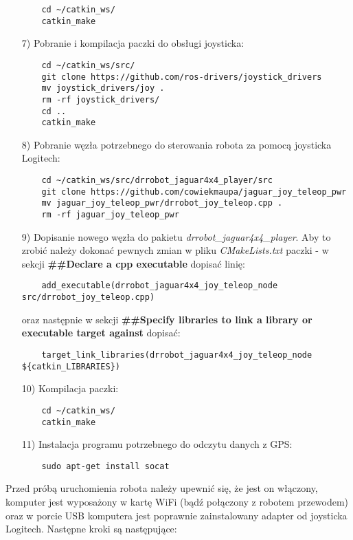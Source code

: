 \begin{enumerate}
	\begin{verbatim}
	cd ~/catkin_ws/
	catkin_make
	\end{verbatim}
\item[7)] Pobranie i kompilacja paczki do obsługi joysticka:
	\begin{verbatim}
	cd ~/catkin_ws/src/
	git clone https://github.com/ros-drivers/joystick_drivers
	mv joystick_drivers/joy .
	rm -rf joystick_drivers/
	cd ..
	catkin_make
	\end{verbatim}
\item[8)] Pobranie węzła potrzebnego do sterowania robota za pomocą joysticka Logitech:
	\begin{verbatim}
	cd ~/catkin_ws/src/drrobot_jaguar4x4_player/src
	git clone https://github.com/cowiekmaupa/jaguar_joy_teleop_pwr
	mv jaguar_joy_teleop_pwr/drrobot_joy_teleop.cpp .
	rm -rf jaguar_joy_teleop_pwr
	\end{verbatim}
\newpage
\item[9)] Dopisanie nowego węzła do pakietu \textit{drrobot\_jaguar4x4\_player}. Aby to zrobić należy dokonać pewnych zmian w pliku \textit{CMakeLists.txt} paczki  - w sekcji \textbf{\#\#Declare a cpp executable} dopisać linię:
	\begin{verbatim}
	add_executable(drrobot_jaguar4x4_joy_teleop_node src/drrobot_joy_teleop.cpp)
	\end{verbatim}
	oraz następnie w sekcji \textbf{\#\#Specify libraries to link a library or executable target against} dopisać:
	\begin{verbatim}
	target_link_libraries(drrobot_jaguar4x4_joy_teleop_node ${catkin_LIBRARIES})
	\end{verbatim}
\item[10)] Kompilacja paczki:
	\begin{verbatim}
	cd ~/catkin_ws/
	catkin_make
	\end{verbatim}
\item[11)] Instalacja programu potrzebnego do odczytu danych z GPS:
	\begin{verbatim}
	sudo apt-get install socat
	\end{verbatim}
\end{enumerate}
Przed próbą uruchomienia robota należy upewnić się, że jest on włączony, komputer jest wyposażony w kartę WiFi (bądź połączony z robotem przewodem) oraz w porcie USB komputera jest poprawnie zainstalowany adapter od joysticka Logitech. Następne kroki są następujące:
